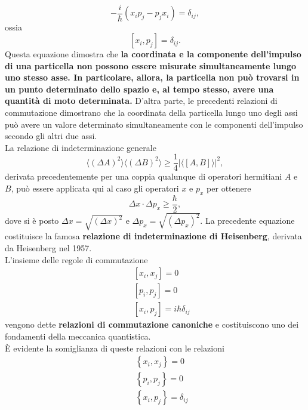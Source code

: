 \begin{equation}
-\frac{i}{\hbar}\left( x_ip_j-p_jx_i\right) =\delta _{ij},
\end{equation}
ossia
\begin{equation}
\left[ x_i, p_j \right] =\delta _{ij}.
\end{equation}
Questa equazione dimostra che \textbf{la coordinata e la componente dell'impulso di una particella non possono essere misurate simultaneamente lungo uno stesso asse. In particolare, allora, la particella non può trovarsi in un punto determinato dello spazio e, al tempo stesso, avere una quantità di moto determinata.} D'altra parte, le precedenti relazioni di commutazione dimostrano che la coordinata della particella lungo uno degli assi può avere un valore determinato simultaneamente con le componenti dell'impulso secondo gli altri due assi.\\
La relazione di indeterminazione generale
\begin{equation}
\langle \left( \Delta A\right)^2\rangle \langle \left( \Delta B\right)^2\rangle \geq \frac{1}{4}\vert \langle \left[A,B\right] \rangle \vert ^2 ,
\end{equation}
derivata precedentemente per una coppia qualunque di operatori hermitiani $A$ e $B$, può essere applicata qui al caso gli operatori $x$ e $p_x$ per ottenere
\begin{equation}
\Delta x \cdot \Delta p_x \geq \frac{\hbar}{2} ,
\end{equation}
dove si è posto $\Delta x = \sqrt{\left(\Delta x\right) ^2}$ e $\Delta p_x = \sqrt{\left(\Delta p_x\right) ^2}$. La precedente equazione costituisce la famosa \textbf{relazione di indeterminazione di Heisenberg}, derivata da Heisenberg nel 1957.\\
L'insieme delle regole di commutazione
\begin{eqnarray}
& &\left[ x_i, x_j\right]=0 \nonumber\\
& &\left[ p_i, p_j\right]=0\\
& &\left[ x_i, p_j\right]=i\hbar \delta _{ij}\nonumber 
\end{eqnarray}
vengono dette \textbf{relazioni di commutazione canoniche} e costituiscono uno dei fondamenti della meccanica quantistica.\\
È evidente la somiglianza di queste relazioni con le relazioni
\begin{eqnarray}
& &\left\{ x_i, x_j\right\}=0 \nonumber\\
& &\left\{ p_i, p_j\right\}=0\\
& &\left\{ x_i, p_j\right\}=\delta _{ij}\nonumber 
\end{eqnarray}
